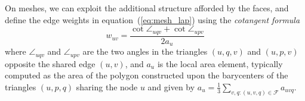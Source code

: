 On meshes, we can exploit the additional structure afforded by the faces, and define the edge weights in equation~(\ref{eq:mesh_lap}) using the {\em cotangent formula} \citep{pinkall1993computing,meyer2003discrete}
\begin{equation}
w_{uv} = \frac{\cot \angle_{uqv} + \cot \angle_{upv}}{2 a_u}
\label{eq:cotan}
\end{equation}
where $\angle_{uqv}$ and $\angle_{upv}$ are the two angles in the triangles $(u,q,v)$ and $(u,p,v)$ opposite the shared edge $(u,v)$, and $a_u$ is the local area element, typically computed as the area of the polygon constructed upon the barycenters of the triangles $(u,p,q)$ sharing the node $u$ and given by
%
$a_u = \frac{1}{3}\sum_{v,q : (u,v,q) \in \mathcal{F}} a_{uvq}$.


